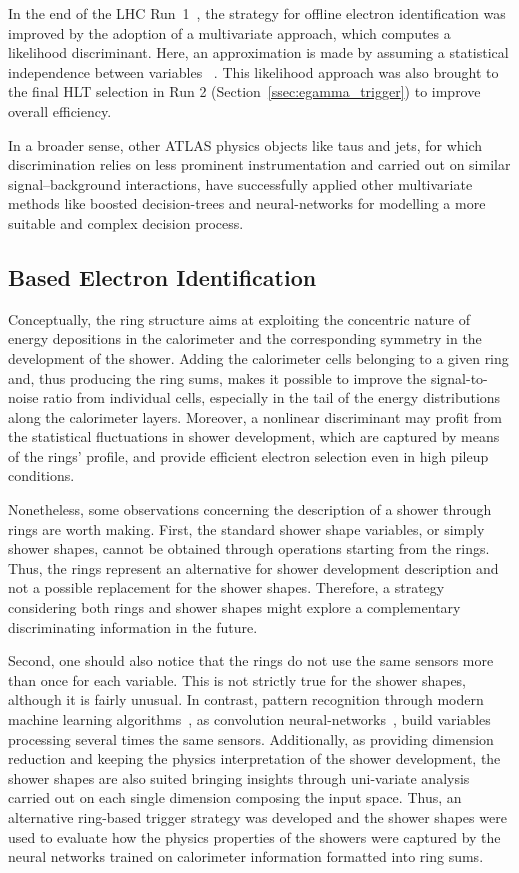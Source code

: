 In the end of the LHC Run~1~\cite{PERF-2016-01}, the strategy for offline electron identification was improved by the adoption of a multivariate approach, which computes a likelihood discriminant. Here, an approximation is made by assuming a statistical independence between variables ~\cite{kendalls_vol2b}. This likelihood approach was also brought to the final HLT selection in Run 2 (Section~\ref{ssec:egamma_trigger}) to improve overall efficiency. 

In a broader sense, other ATLAS physics objects like taus and jets, for
which discrimination relies on less prominent instrumentation and carried out on
similar signal--background interactions, have successfully applied other
multivariate methods like boosted decision-trees and neural-networks for
modelling a more suitable and complex decision process.


\subsection{\rnn{} Based Electron Identification}%

Conceptually, the ring structure aims at exploiting the concentric nature of energy depositions in the calorimeter and the corresponding symmetry in the development of the shower.  Adding the calorimeter cells belonging to a given ring and, thus producing the ring sums, makes it possible to improve the signal-to-noise ratio from individual cells, especially in the tail of the energy distributions along the calorimeter layers.  Moreover, a nonlinear discriminant may profit from the statistical fluctuations in shower development, which are captured by means of the rings' profile, and provide efficient electron selection even in high pileup conditions.


Nonetheless, some observations concerning the description of a shower through rings are worth making. First, the standard shower shape variables, or simply shower shapes, cannot be obtained through operations starting from the rings.  Thus, the rings represent an alternative for shower development description and not a possible replacement for the shower shapes.  Therefore, a strategy considering both rings and shower shapes might explore a complementary discriminating information in the future.

Second, one should also notice
that the rings do not use the same sensors more than once for each variable.
This is not strictly true for the shower shapes, although it is fairly unusual.
In contrast, pattern recognition through modern machine learning
algorithms~\cite{Engelbrecht2007,Goodfellow2016}, as convolution
neural-networks~\cite{Gu2018}, build variables processing several times
the same sensors. Additionally, as providing dimension reduction and keeping the physics interpretation of the shower development, the shower shapes are also suited bringing insights through uni-variate analysis carried out on each
single dimension composing the input space.
Thus, an alternative ring-based trigger strategy was developed and the shower shapes were used to evaluate how the physics properties of the showers were captured by the neural networks trained on calorimeter information formatted into ring sums. 


